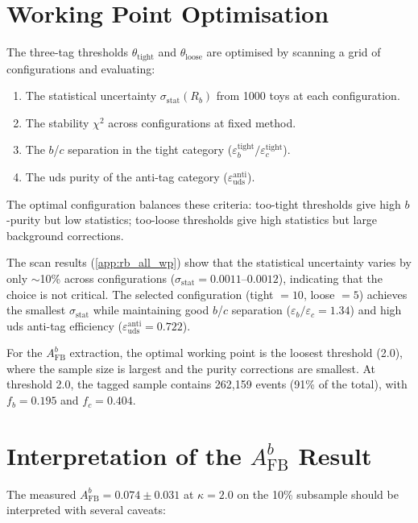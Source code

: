 \documentclass[11pt,a4paper]{article}
\begin{document}
\section{Working Point Optimisation}
\label{app:wp_optimisation}

The three-tag thresholds $\theta_\text{tight}$ and
$\theta_\text{loose}$ are optimised by scanning a grid of
configurations and evaluating:
\begin{enumerate}
\item The statistical uncertainty $\sigma_\text{stat}(R_b)$ from
  1000 toys at each configuration.
\item The stability $\chi^2$ across configurations at fixed
  method.
\item The $b$/$c$ separation in the tight category
  ($\varepsilon_b^\text{tight} / \varepsilon_c^\text{tight}$).
\item The uds purity of the anti-tag category
  ($\varepsilon_\text{uds}^\text{anti}$).
\end{enumerate}

The optimal configuration balances these criteria: too-tight
thresholds give high $b$-purity but low statistics; too-loose
thresholds give high statistics but large background corrections.

The scan results (\cref{app:rb_all_wp}) show that the statistical
uncertainty varies by only $\sim$10\% across configurations
($\sigma_\text{stat} = 0.0011$--$0.0012$), indicating that the
choice is not critical.
The selected configuration (tight $= 10$, loose $= 5$) achieves
the smallest $\sigma_\text{stat}$ while maintaining good
$b$/$c$ separation ($\varepsilon_b/\varepsilon_c = 1.34$) and
high uds anti-tag efficiency ($\varepsilon_\text{uds}^\text{anti}
= 0.722$).

For the $A_\text{FB}^b$ extraction, the optimal working point is
the loosest threshold (2.0), where the sample size is largest
and the purity corrections are smallest.
At threshold 2.0, the tagged sample contains 262,159 events
(91\% of the total), with $f_b = 0.195$ and
$f_c = 0.404$.

\section{Interpretation of the $A_\text{FB}^b$ Result}
\label{app:afb_interpretation}

The measured $A_\text{FB}^b = 0.074 \pm 0.031$ at $\kappa = 2.0$
on the 10\% subsample should be interpreted with several caveats:
\end{document}

